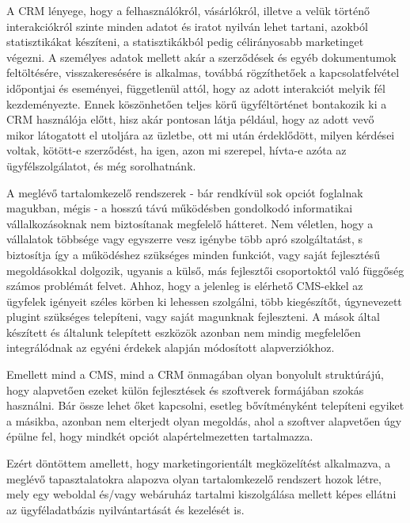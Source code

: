 A CRM lényege, hogy a felhasználókról, vásárlókról, illetve a velük történő interakciókról szinte minden adatot és iratot nyilván lehet tartani, azokból statisztikákat készíteni, a statisztikákból pedig célirányosabb marketinget végezni. A személyes adatok mellett akár a szerződések és egyéb dokumentumok feltöltésére, visszakeresésére is alkalmas, továbbá rögzíthetőek a kapcsolatfelvétel időpontjai és eseményei, függetlenül attól, hogy az adott interakciót melyik fél kezdeményezte. Ennek köszönhetően teljes körű ügyféltörténet bontakozik ki a CRM használója előtt, hisz akár pontosan látja például, hogy az adott vevő mikor látogatott el utoljára az üzletbe, ott mi után érdeklődött, milyen kérdései voltak, kötött-e szerződést, ha igen, azon mi szerepel, hívta-e azóta az ügyfélszolgálatot, és még sorolhatnánk.


A meglévő tartalomkezelő rendszerek - bár rendkívül sok opciót foglalnak magukban, mégis - a hosszú távú működésben gondolkodó informatikai vállalkozásoknak nem biztosítanak megfelelő hátteret. Nem véletlen, hogy a vállalatok többsége vagy egyszerre vesz igénybe több apró szolgáltatást, s biztosítja így a működéshez szükséges minden funkciót, vagy saját fejlesztésű megoldásokkal dolgozik, ugyanis a külső, más fejlesztői csoportoktól való függőség számos problémát felvet. Ahhoz, hogy a jelenleg is elérhető CMS-ekkel az ügyfelek igényeit széles körben ki lehessen szolgálni, több kiegészítőt, úgynevezett plugint szükséges telepíteni, vagy saját magunknak fejleszteni. A mások által készített és általunk telepített eszközök azonban nem mindig megfelelően integrálódnak az egyéni érdekek alapján módosított alapverziókhoz.

Emellett mind a CMS, mind a CRM önmagában olyan bonyolult struktúrájú, hogy alapvetően ezeket külön fejlesztések és szoftverek formájában szokás használni. Bár össze lehet őket kapcsolni, esetleg bővítményként telepíteni egyiket a másikba, azonban nem elterjedt olyan megoldás, ahol a szoftver alapvetően úgy épülne fel, hogy mindkét opciót alapértelmezetten tartalmazza.

Ezért döntöttem amellett, hogy marketingorientált megközelítést alkalmazva, a meglévő tapasztalatokra alapozva olyan tartalomkezelő rendszert hozok létre, mely egy weboldal és/vagy webáruház tartalmi kiszolgálása mellett képes ellátni az ügyféladatbázis nyilvántartását és kezelését is.